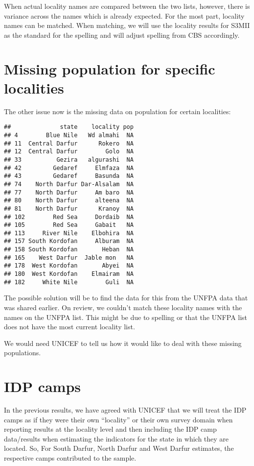 \documentclass[12pt,a4paper]{article}
\begin{document}
When actual locality names are compared between the two lists, however, there is variance across the names which is already expected. For the most part, locality names can be matched. When matching, we will use the locality results for S3MII as the standard for the spelling and will adjust spelling from CBS accordingly.

\newpage

\hypertarget{missing-population-for-specific-localities}{%
\section{Missing population for specific localities}\label{missing-population-for-specific-localities}}

The other issue now is the missing data on population for certain localities:

\begin{verbatim}
##              state    locality pop
## 4        Blue Nile   Wd almahi  NA
## 11  Central Darfur      Rokero  NA
## 12  Central Darfur        Golo  NA
## 33          Gezira   algurashi  NA
## 42         Gedaref     Elmfaza  NA
## 43         Gedaref     Basunda  NA
## 74    North Darfur Dar-Alsalam  NA
## 77    North Darfur     Am baro  NA
## 80    North Darfur     alteena  NA
## 81    North Darfur      Kranoy  NA
## 102        Red Sea     Dordaib  NA
## 105        Red Sea     Gabait   NA
## 113     River Nile    Elbohira  NA
## 157 South Kordofan     Alburam  NA
## 158 South Kordofan       Heban  NA
## 165    West Darfur  Jable mon   NA
## 178  West Kordofan       Abyei  NA
## 180  West Kordofan    Elmairam  NA
## 182     White Nile        Guli  NA
\end{verbatim}

The possible solution will be to find the data for this from the UNFPA data that was shared earlier. On review, we couldn't match these locality names with the names on the UNFPA list. This might be due to spelling or that the UNFPA list does not have the most current locality list.

We would need UNICEF to tell us how it would like to deal with these missing populations.

\hypertarget{idp-camps}{%
\section{IDP camps}\label{idp-camps}}

In the previous results, we have agreed with UNICEF that we will treat the IDP camps as if they were their own ``locality'' or their own survey domain when reporting results at the locality level and then including the IDP camp data/results when estimating the indicators for the state in which they are located. So, For South Darfur, North Darfur and West Darfur estimates, the respective camps contributed to the sample.
\end{document}
